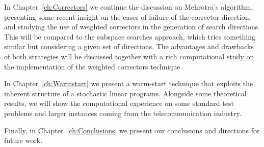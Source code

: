 In Chapter~\ref{ch:Correctors} we continue the discussion on
Mehrotra's algorithm, presenting some recent insight on the
cases of failure of the corrector direction, and studying the use of
weighted correctors in the generation of search directions. This will
be compared to the subspace searches approach, which tries something
similar but considering a given set of directions. The advantages
and drawbacks of both strategies will be discussed together with
a rich computational study on the implementation of the
weighted correctors technique.

In Chapter~\ref{ch:Warmstart} we present a warm-start technique
that exploits the inherent structure of a stochastic linear programs.
Alongside some theoretical results, we will show the computational
experience on some standard test problems and larger instances coming
from the telecommunication industry.

Finally, in Chapter~\ref{ch:Conclusions} we present our conclusions
and directions for future work.
